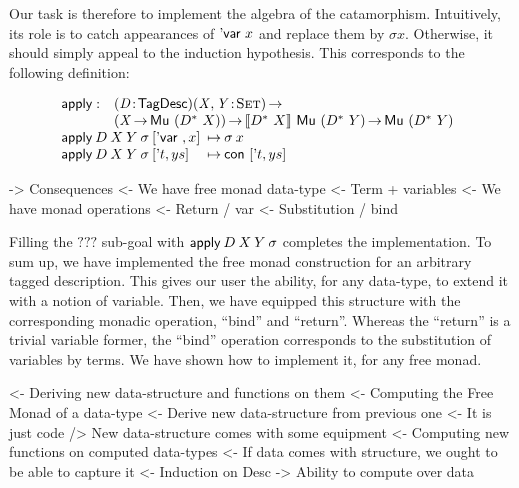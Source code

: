 Our task is therefore to implement the algebra of the
catamorphism. Intuitively, its role is to catch appearances of
$\DVar{x}$ and replace them by $\sigma x$. Otherwise, it should simply
appeal to the induction hypothesis. This corresponds to the following
definition:

\[\stk{
\begin{array}{@{}ll}
\apply : & \PITEL{\V{D}}{\TagDesc} 
           \PI{\V{X}, \V{Y}}{\Set} \\
         & (\V{X} \To \Mu{(\FreeMonad{D}{X})}) \To
           \descop{\FreeMonad{D}{X}}{\Mu{(\FreeMonad{D}{Y})}} \To
           \Mu{(\FreeMonad{D}{Y})}                            \\
\end{array} \\
\begin{array}{@{}l@{\:\:\mapsto\:}l}
\apply\: D\: X\: Y\: \sigma\: \pair{\DVar{}}{x}{}     & \sigma\: x                   \\
\apply\: D\: X\: Y\: \sigma\: \pair{\etag{t}}{ys}{} & \Con{\pair{\etag{t}}{ys}{}}
\end{array}
}\]

\begin{wstructure}
    -> Consequences
        <- We have free monad data-type
            <- Term + variables
        <- We have monad operations
            <- Return / var
            <- Substitution / bind
\end{wstructure}

Filling the $???$ sub-goal with $\apply\: D\: X\: Y\: \sigma$
completes the implementation. To sum up, we have implemented the free
monad construction for an arbitrary tagged description. This gives our
user the ability, for any data-type, to extend it with a notion of
variable. Then, we have equipped this structure with the corresponding
monadic operation, ``bind'' and ``return''. Whereas the ``return'' is
a trivial variable former, the ``bind'' operation corresponds to the
substitution of variables by terms. We have shown how to implement it,
for any free monad.


\begin{wstructure}
<- Deriving new data-structure and functions on them
    <- Computing the Free Monad of a data-type
        <- Derive new data-structure from previous one
            <- It is just code
        /> New data-structure comes with some equipment
    <- Computing new functions on computed data-types
        <- If data comes with structure, we ought to be able to capture it
            <- Induction on Desc
            -> Ability to compute over data
\end{wstructure}

